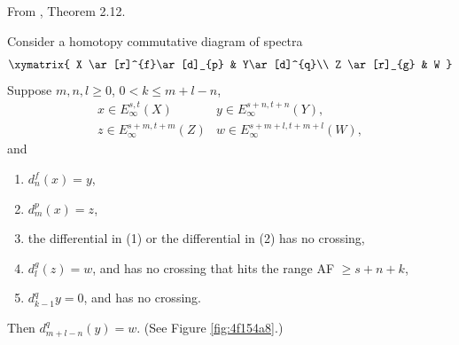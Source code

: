 \begin{theorem}
\label{paper:2.12}
From \cite{LWX126}, Theorem 2.12.\par
\label{thm:4114f70c}
    Consider a homotopy commutative diagram of spectra
    $$\xymatrix{
    X \ar[r]^{f}\ar[d]_{p} & Y\ar[d]^{q}\\
    Z \ar[r]_{g} & W
    }$$
    Suppose $m,n,l\ge 0$, $0<k\le m+l-n$,
    $$\begin{array}{ll}
        x\in E^{s,t}_\infty(X) & y\in E^{s+n,t+n}_\infty(Y),\\
        z\in E^{s+m,t+m}_\infty(Z) & w\in E^{s+m+l,t+m+l}_\infty(W),
    \end{array}$$
    and
    \begin{enumerate}
        \item $d^{f}_{n}(x)=y$,
        \item $d^{p}_{m}(x)=z$,
        \item the differential in (1) or the differential in (2) has no crossing,
        \item $d^{g}_{l}(z)=w$, and has no crossing that hits the range AF $\ge s+n+k$,
        \item $d^{q}_{k-1} y=0$, and has no crossing.
    \end{enumerate}
    Then $d^{q}_{m+l-n}(y)=w$. (See Figure \ref{fig:4f154a8}.)



\end{theorem}
